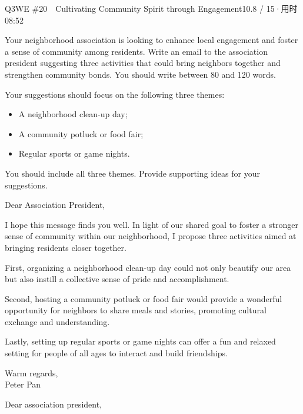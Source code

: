 \begin{qblock}{Q3\quad WE \#20\ \ Cultivating Community Spirit through Engagement}{10.8 / 15\quad·\quad 用时 08:52}

\begin{promptbox}
Your neighborhood association is looking to enhance local engagement and foster a sense of community among residents. Write an email to the association president suggesting three activities that could bring neighbors together and strengthen community bonds. You should write between 80 and 120 words.

\smallskip Your suggestions should focus on the following three themes:
\begin{itemize}[leftmargin=1.4em,topsep=2pt,itemsep=0pt]
  \item A neighborhood clean-up day;
  \item A community potluck or food fair;
  \item Regular sports or game nights.
\end{itemize}
You should include all three themes. Provide supporting ideas for your suggestions.
\end{promptbox}

\begin{modelbox}
Dear Association President,

I hope this message finds you well. In light of our shared goal to foster a stronger sense of community within our neighborhood, I propose three activities aimed at bringing residents closer together.

First, organizing a neighborhood clean-up day could not only beautify our area but also instill a collective sense of pride and accomplishment.

Second, hosting a community potluck or food fair would provide a wonderful opportunity for neighbors to share meals and stories, promoting cultural exchange and understanding.

Lastly, setting up regular sports or game nights can offer a fun and relaxed setting for people of all ages to interact and build friendships.

Warm regards,\\ Peter Pan
\end{modelbox}

\begin{youbox}
Dear association president,


\end{youbox}
\end{qblock}

